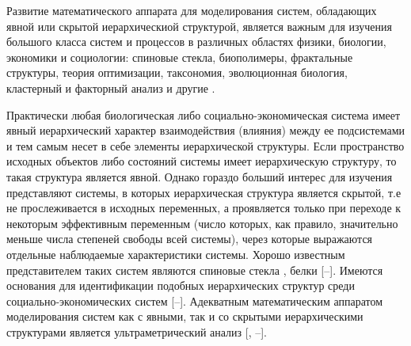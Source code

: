 

\date{05/XI/2012}

\maketitle


 Развитие математического аппарата для
моделирования систем, обладающих явной или скрытой иерархическиой
структурой, является важным для изучения большого класса систем и
процессов в различных областях физики, биологии, экономики и
социологии: спиновые стекла, биополимеры, фрактальные структуры,
теория оптимизации, таксономия, эволюционная биология, кластерный
и факторный анализ и другие
\cite{zubarev_volov:bib:RTV,zubarev_volov:bib:ALL}.

Практически любая биологическая либо социально-экономическая
система имеет явный иерархический характер взаимодействия
(влияния) между ее подсистемами и тем самым несет в себе элементы
иерархической структуры. Если пространство исходных объектов либо
состояний системы имеет иерархическую структуру, то такая
структура является явной. Однако гораздо больший интерес для изучения
представляют системы, в которых иерархическая структура является
скрытой, т.е не прослеживается в исходных переменных, а
проявляется только при переходе к некоторым эффективным переменным
(число которых, как правило, значительно меньше числа степеней
свободы всей системы), через которые выражаются отдельные
наблюдаемые характеристики системы. Хорошо известным
представителем таких систем являются спиновые стекла
\cite{zubarev_volov:bib:Dot}, белки
[--].
Имеются основания для идентификации подобных иерархических
структур среди социально-экономических систем
[--].
Адекватным математическим аппаратом моделирования систем как с
явными, так и со скрытыми иерархическими структурами является
ультраметрический анализ [,
--].

